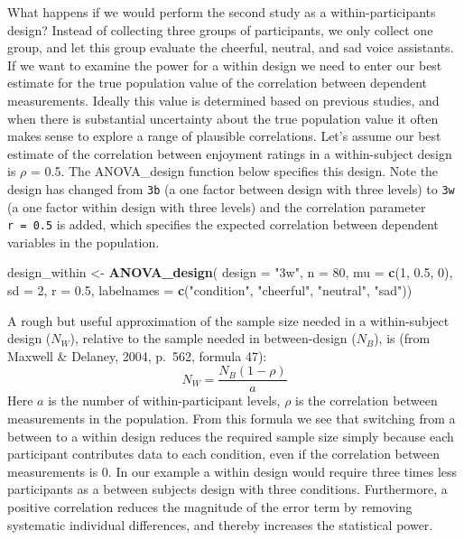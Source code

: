 \documentclass[
  english,
  ,jou,floatsintext]{apa6}
\newenvironment{Shaded}{\begin{snugshade}}{\end{snugshade}}
\newcommand{\DataTypeTok}[1]{\textcolor[rgb]{0.13,0.29,0.53}{#1}}
\newcommand{\DecValTok}[1]{\textcolor[rgb]{0.00,0.00,0.81}{#1}}
\newcommand{\FloatTok}[1]{\textcolor[rgb]{0.00,0.00,0.81}{#1}}
\newcommand{\KeywordTok}[1]{\textcolor[rgb]{0.13,0.29,0.53}{\textbf{#1}}}
\newcommand{\NormalTok}[1]{#1}
\newcommand{\StringTok}[1]{\textcolor[rgb]{0.31,0.60,0.02}{#1}}
\begin{document}
What happens if we would perform the second study as a within-participants design?
Instead of collecting three groups of participants, we only collect one group, and let this group evaluate the cheerful, neutral, and sad voice assistants.
If we want to examine the power for a within design we need to enter our best estimate for the true population value of the correlation between dependent measurements.
Ideally this value is determined based on previous studies, and when there is substantial uncertainty about the true population value it often makes sense to explore a range of plausible correlations.
Let's assume our best estimate of the correlation between enjoyment ratings in a within-subject design is \(\rho\) = 0.5.
The ANOVA\_design function below specifies this design.
Note the design has changed from \texttt{3b} (a one factor between design with three levels) to \texttt{3w} (a one factor within design with three levels) and the correlation parameter \texttt{r\ =\ 0.5} is added, which specifies the expected correlation between dependent variables in the population.

\begin{Shaded}
\begin{Highlighting}[]
\NormalTok{design_within <-}\StringTok{ }\KeywordTok{ANOVA_design}\NormalTok{(}
  \DataTypeTok{design =} \StringTok{"3w"}\NormalTok{, }\DataTypeTok{n =} \DecValTok{80}\NormalTok{, }\DataTypeTok{mu =} \KeywordTok{c}\NormalTok{(}\DecValTok{1}\NormalTok{, }\FloatTok{0.5}\NormalTok{, }\DecValTok{0}\NormalTok{), }
  \DataTypeTok{sd =} \DecValTok{2}\NormalTok{, }\DataTypeTok{r =} \FloatTok{0.5}\NormalTok{,}
  \DataTypeTok{labelnames =} \KeywordTok{c}\NormalTok{(}\StringTok{"condition"}\NormalTok{, }
                 \StringTok{"cheerful"}\NormalTok{, }
                 \StringTok{"neutral"}\NormalTok{, }\StringTok{"sad"}\NormalTok{))}
\end{Highlighting}
\end{Shaded}

A rough but useful approximation of the sample size needed in a within-subject design (\(N_W\)), relative to the sample needed in between-design (\(N_B\)), is (from Maxwell \& Delaney, 2004, p.~562, formula 47):
\begin{equation}
N_{W}=\frac{N_{B}(1-\rho)}{a} \label{eq:within-n}
\end{equation}
Here \(a\) is the number of within-participant levels, \(\rho\) is the correlation between measurements in the population.
From this formula we see that switching from a between to a within design reduces the required sample size simply because each participant contributes data to each condition, even if the correlation between measurements is 0.
In our example a within design would require three times less participants as a between subjects design with three conditions.
Furthermore, a positive correlation reduces the magnitude of the error term by removing systematic individual differences, and thereby increases the statistical power.
\end{document}
